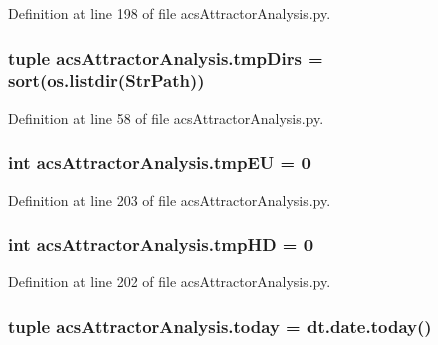 Definition at line 198 of file acs\+Attractor\+Analysis.\+py.

\hypertarget{a00124_ac88c3245a42ebefee3fcf90626f6eaf4}{
\subsubsection[{tmp\+Dirs}]{\setlength{\rightskip}{0pt plus 5cm}tuple acs\+Attractor\+Analysis.\+tmp\+Dirs = sort(os.\+listdir({\bf Str\+Path}))}}\label{a00124_ac88c3245a42ebefee3fcf90626f6eaf4}


Definition at line 58 of file acs\+Attractor\+Analysis.\+py.

\hypertarget{a00124_a0c4860774229747cda9dabe70614abc6}{
\subsubsection[{tmp\+E\+U}]{\setlength{\rightskip}{0pt plus 5cm}int acs\+Attractor\+Analysis.\+tmp\+E\+U = 0}}\label{a00124_a0c4860774229747cda9dabe70614abc6}


Definition at line 203 of file acs\+Attractor\+Analysis.\+py.

\hypertarget{a00124_a1fe1582f1d1dc5f55558d25c8eb30ad7}{
\subsubsection[{tmp\+H\+D}]{\setlength{\rightskip}{0pt plus 5cm}int acs\+Attractor\+Analysis.\+tmp\+H\+D = 0}}\label{a00124_a1fe1582f1d1dc5f55558d25c8eb30ad7}


Definition at line 202 of file acs\+Attractor\+Analysis.\+py.

\hypertarget{a00124_a71bc5e3d205016fb7893b438e75be78e}{
\subsubsection[{today}]{\setlength{\rightskip}{0pt plus 5cm}tuple acs\+Attractor\+Analysis.\+today = dt.\+date.\+today()}}\label{a00124_a71bc5e3d205016fb7893b438e75be78e}


